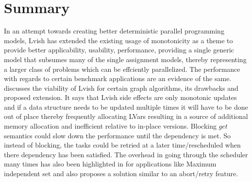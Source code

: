 \documentclass[twocolumn]{article}
\begin{document}
\section{Summary}
\label{summary}
In an attempt towards creating better deterministic parallel programming models, Lvish has extended the existing usage of monotonicity as a theme to provide better applicability, usability, performance, providing a single generic model that subsumes
many of the single assignment models, thereby representing a larger class of problems which can be effciently parallelized. The performance with regards to certain benchmark applications are an evidence of the same. \cite{newton1}discusses the viability of Lvish for certain graph algorithms, its drawbacks and proposed extension. It says that Lvish side effects are only monotonic updates and if a data structure needs to be updated multiple times it will have to be done out of place thereby frequently allocating LVars resulting in a source of additional memory allocation and inefficient relative to in-place versions. Blocking $get$ semantics could slow down the performance until the dependency is met. So instead of blocking, the tasks could be retried at a later time/rescheduled when there dependency has been satisfied. The overhead in going through the scheduler many times has also been highlighted in\cite{newton1} for applications like Maximum independent set and also proposes a solution similar to an abort/retry feature.

 
\end{document}
